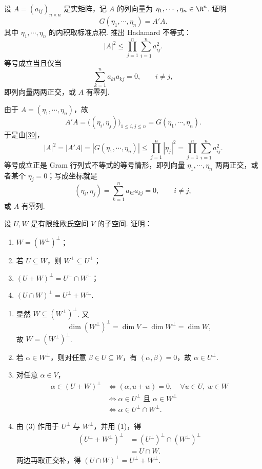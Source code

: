 \begin{problem}

	设 $A=(a_{ij})_{n\times n}$ 是实矩阵，记 $A$ 的列向量为 $\eta_1,\cdots,\eta_n\in\R^n$. 证明
	\[
	G(\eta_1,\cdots,\eta_n)=A'A.
	\]
	其中 $\eta_1,\cdots,\eta_n$ 的内积取标准点积. 推出 Hadamard 不等式：
	\[
	|A|^2\leqslant \prod_{j=1}^n\sum_{i=1}^n a_{ij}^2.
	\]
	等号成立当且仅当
	\[
	\sum_{k=1}^n a_{ki}a_{kj}=0,
	\qquad i\ne j,
	\]
	即列向量两两正交，或 $A$ 有零列.
\end{problem}
\begin{solution}
	由于 $A=(\eta_1,\cdots,\eta_n)$，故
	\[
	A'A=\bigl((\eta_i,\eta_j)\bigr)_{1\leqslant i,j\leqslant n}=G(\eta_1,\cdots,\eta_n).
	\]
	于是由\ref{39}，
	\[
	|A|^2=|A'A|=|G(\eta_1,\cdots,\eta_n)|
	\leqslant \prod_{j=1}^n |\eta_j|^2
	=\prod_{j=1}^n\sum_{i=1}^n a_{ij}^2.
	\]
	等号成立正是 Gram 行列式不等式的等号情形，即列向量 $\eta_1,
	\cdots,\eta_n$ 两两正交，或者某个 $\eta_j=0$；写成坐标就是
	\[
	(\eta_i,\eta_j)=\sum_{k=1}^n a_{ki}a_{kj}=0,
	\qquad i\ne j,
	\]
	或 $A$ 有零列.
\end{solution}

\begin{problem}

	设 $U,W$ 是有限维欧氏空间 $V$ 的子空间. 证明：
	\begin{enumerate}
		\item $W=(W^\perp)^\perp$；
		\item 若 $U\subseteq W$，则 $W^\perp\subseteq U^\perp$；
		\item $(U+W)^\perp=U^\perp\cap W^\perp$；
		\item $(U\cap W)^\perp=U^\perp+W^\perp$.
	\end{enumerate}
\end{problem}
\begin{solution}
	\begin{enumerate}
		\item 显然 $W\subseteq (W^\perp)^\perp$. 又
		\[
		\dim (W^\perp)^\perp=\dim V-\dim W^\perp=\dim W,
		\]
		故 $W=(W^\perp)^\perp$.
		\item 若 $\alpha\in W^\perp$，则对任意 $\beta\in U\subseteq W$，有 $(\alpha,\beta)=0$，故 $\alpha\in U^\perp$.
		\item 对任意 $\alpha\in V$，
		\[
		\begin{aligned}
			\alpha\in (U+W)^\perp
			&\Longleftrightarrow (\alpha,u+w)=0,
			\quad \forall u\in U,\ w\in W \\
			&\Longleftrightarrow \alpha\in U^\perp\text{ 且 }\alpha\in W^\perp \\
			&\Longleftrightarrow \alpha\in U^\perp\cap W^\perp.
		\end{aligned}
		\]
		\item 由 (3) 作用于 $U^\perp$ 与 $W^\perp$，并用 (1)，得
		\[
		\begin{aligned}
			(U^\perp+W^\perp)^\perp
			&=(U^\perp)^\perp\cap(W^\perp)^\perp \\
			&=U\cap W.
		\end{aligned}
		\]
		两边再取正交补，得 $(U\cap W)^\perp=U^\perp+W^\perp$.
	\end{enumerate}
\end{solution}

